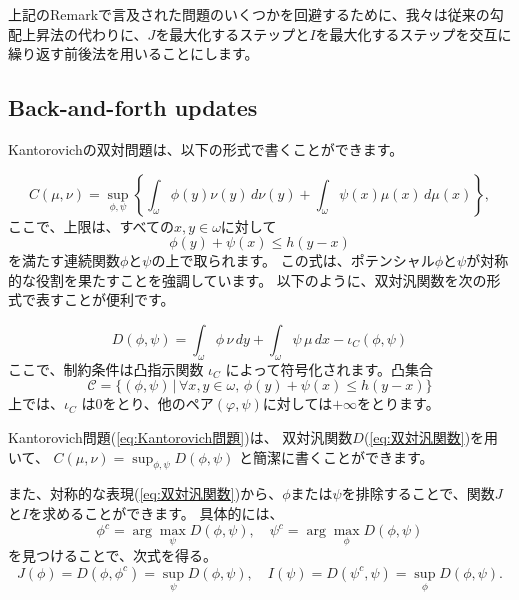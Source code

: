 \documentclass{jsarticle}
\theoremstyle{definition}
\begin{document}
\vspace\baselineskip 

上記のRemarkで言及された問題のいくつかを回避するために、我々は従来の勾配上昇法の代わりに、$J$を最大化するステップと$I$を最大化するステップを交互に繰り返す前後法を用いることにします。



\subsection{Back-and-forth updates}

Kantorovichの双対問題は、以下の形式で書くことができます。

\begin{equation}
  \label{eq:Kantorovich問題}
  C(\mu,\nu)=\sup_{\phi,\psi} \left\{\int_\omega \phi(y) \nu(y) \,d\nu(y)+\int_\omega \psi(x) \mu(x)\,d\mu(x)\right\},
\end{equation}
ここで、上限は、すべての$x,y\in \omega$に対して
$$
\phi(y)+\psi(x)\leq h(y-x)
$$
を満たす連続関数$\phi$と$\psi$の上で取られます。
この式は、ポテンシャル$\phi$と$\psi$が対称的な役割を果たすことを強調しています。
以下のように、双対汎関数を次の形式で表すことが便利です。

\begin{equation}
  \label{eq:双対汎関数}
  D(\phi, \psi) = \int_\omega \phi \,\nu\, dy + \int_\omega \psi \,\mu\, dx - \iota_C(\phi,\psi)
\end{equation}
ここで、制約条件は凸指示関数 $\iota_C$ によって符号化されます。凸集合
$$
\mathcal{C}  = \{(\phi,\psi) \,| \, \forall x,y \in \omega,\, \phi(y) + \psi(x) \leq h(y-x)\}
$$
上では、$\iota_C$ は0をとり、他のペア$(\varphi, \psi)$に対しては$+ \infty$をとります。


Kantorovich問題(\ref{eq:Kantorovich問題})は、 双対汎関数$D$(\ref{eq:双対汎関数})を用いて、
$C(\mu, \nu) = \sup_{\phi, \psi} D(\phi, \psi)$
と簡潔に書くことができます。

また、対称的な表現(\ref{eq:双対汎関数})から、$\phi$または$\psi$を排除することで、関数$J$と$I$を求めることができます。
具体的には、
$$
\phi^c = \arg\max_\psi D(\phi, \psi), \quad \psi^c = \arg\max_\phi D(\phi, \psi)
$$
を見つけることで、次式を得る。
$$
J(\phi) = D(\phi, \phi^c) = \sup_\psi D(\phi, \psi), \quad I(\psi) = D(\psi^c, \psi) = \sup_\phi D(\phi, \psi).
$$
\end{document}

